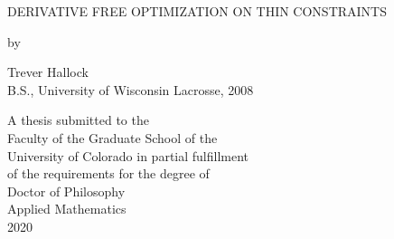 
\begin{titlepage}
    \begin{center}
        \vspace*{1cm}
        
        \Large
        {DERIVATIVE FREE OPTIMIZATION ON THIN CONSTRAINTS}
                
        \vspace{0.5cm}
        
        {by}
        \vspace{0.5cm}
        
        \Large
        {Trever Hallock}\\
        	{B.S., University of Wisconsin Lacrosse, 2008}\\
        
        \vfill
        
        \large
A thesis submitted to the\\
Faculty of the Graduate School of the \\
University of Colorado in partial fulfillment\\
 of the requirements for the degree of \\
 Doctor of Philosophy \\
Applied Mathematics \\
2020
        
        \vspace{0.8cm}
        
    \end{center}
\end{titlepage}
